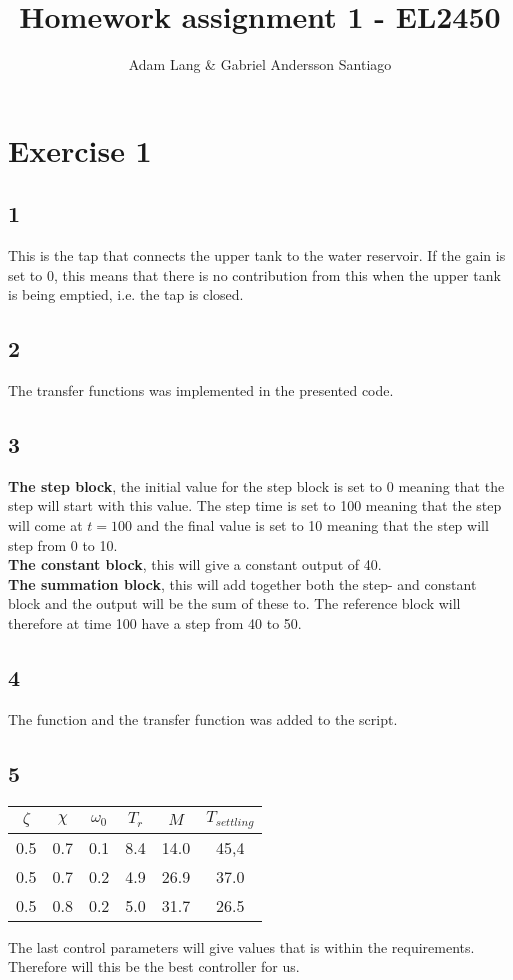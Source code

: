 \documentclass[12pt,a4paper]{article}
\title{Homework assignment 1 - EL2450}
\author{Adam Lang & Gabriel Andersson Santiago}
\begin{document}
\maketitle

\section{Exercise 1}
  
  \subsection{1}
  This is the tap that connects the upper tank to the water reservoir.
  If the gain is set to 0, this means that there is no contribution from
  this when the upper tank is being emptied, i.e. the tap is closed.
  
  \subsection{2}
  The transfer functions was implemented in the presented code.
  
  \subsection{3}
  \textbf{The step block}, the initial value for the step block is set to 
  0 meaning that the step will start with this value. The step time is
  set to 100 meaning that the step will come at $t=100$ and the final
  value is set to 10 meaning that the step will step from 0 to 10.\\
  \textbf{The constant block}, this will give a constant output of 40.\\
  \textbf{The summation block}, this will add together both the step-
  and constant block and the output will be the sum of these to. The
  reference block will therefore at time 100 have a step from 40 to 50.
  
  \subsection{4}
  The function and the transfer function was added to the script.

  \subsection{5}
  \begin{center}
    \begin{tabular}{|c | c | c | c | c | c |}
      \hline
      $\zeta$ & $\chi$ & $\omega_0$ & $T_r$ & $M$ & $T_{settling}$ \\
      \hline
      0.5 & 0.7 & 0.1 & 8.4 & 14.0 & 45,4 \\ 
      0.5 & 0.7 & 0.2 & 4.9 & 26.9 & 37.0 \\ 
      0.5 & 0.8 & 0.2 & 5.0 & 31.7 & 26.5 \\ \hline
    \end{tabular}
  \end{center}
  The last control parameters will give values that is within the
  requirements. Therefore will this be the best controller for us. 
\end{document}

